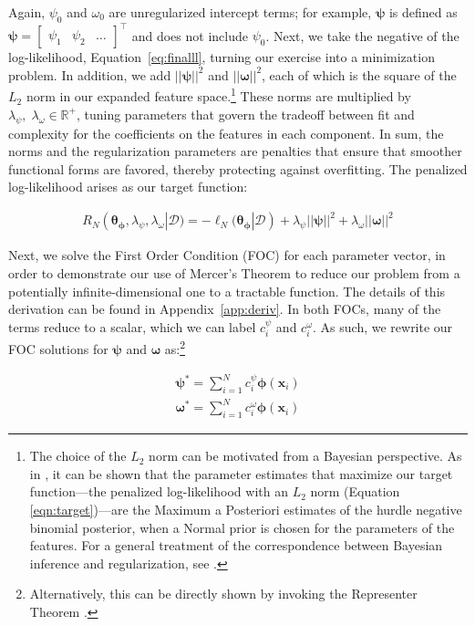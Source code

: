 \documentclass[12pt]{article}
\newcommand{\x}{\mathbf{x}}
\newcommand{\bomega}{\bm{\omega}}
\newcommand{\bpsi}{\bm{\psi}}
\newcommand{\bphi}{\bm{\phi}}
\newcommand{\btheta}{\bm{\theta}}
\begin{document}
Again, $\psi_0$ and $\omega_0$ are unregularized intercept terms; for example, $\bpsi$ is defined as $\bpsi = \begin{bmatrix} \psi_1 & \psi_2 & \dots \end{bmatrix}^\top$ and does not include $\psi_0$. Next, we take the negative of the log-likelihood, Equation~\ref{eq:finalll}, turning our exercise into a minimization problem. In addition, we add $||\bpsi||^2$ and $||\bomega||^2$, each of which is the square of the $L_2$ norm in our expanded feature space.\footnote{The choice of the $L_2$ norm can be motivated from a Bayesian perspective. As in \cite{Hainmueller2013}, it can be shown that the parameter estimates that maximize our target function---the penalized log-likelihood with an $L_2$ norm (Equation \ref{eqn:target})---are the Maximum a Posteriori estimates of the hurdle negative binomial posterior, when a Normal prior is chosen for the parameters of the features. For a general treatment of the correspondence between Bayesian inference and regularization, see \cite{Kimeldorf1970}.} These norms are multiplied by $\lambda_\psi, \; \lambda_\omega \in \mathbb{R}^+$, tuning parameters that govern the tradeoff between fit and complexity for the coefficients on the features in each component. In sum, the norms and the regularization parameters are penalties that ensure that smoother functional forms are favored, thereby protecting against overfitting. The penalized log-likelihood arises as our target function:

\begin{align}	\label{eqn:target}
  R_N (\btheta_{\bphi}, \lambda_\psi, \lambda_\omega | \mathcal{D}) =
    - \ell_N(\btheta_{\bphi} | \mathcal{D}) + \lambda_\psi ||\bpsi||^2 + \lambda_\omega ||\bomega||^2
\end{align} 

Next, we solve the First Order Condition (FOC) for each parameter vector, in order to demonstrate our use of Mercer's Theorem to reduce our problem from a potentially infinite-dimensional one to a tractable function. The details of this derivation can be found in Appendix~\ref{app:deriv}. In both FOCs, many of the terms reduce to a scalar, which we can label $c^\psi_i$ and $c^\omega_i$. As such, we rewrite our FOC solutions for $\bpsi$ and $\bomega$ as:\footnote{Alternatively, this can be directly shown by invoking the Representer Theorem \citep{Kimeldorf1971}.}

\begin{align}
  \bpsi^* = \sum^N_{i=1} c^\psi_i \bphi(\x_i) \\
  \bomega^* = \sum^N_{i=1} c^\omega_i \bphi(\x_i) 
\end{align} 
\end{document}
